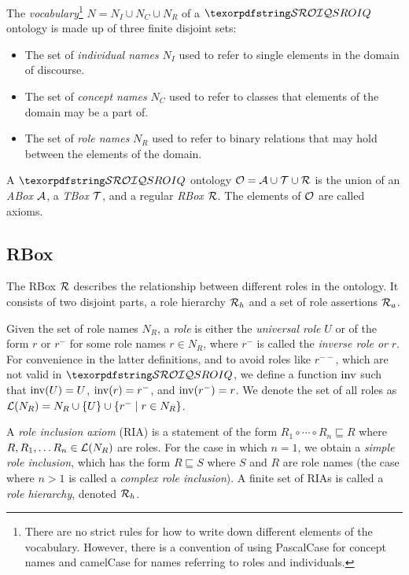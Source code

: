 
The \emph{vocabulary}\footnote{There are no strict rules for how to write down different elements of the vocabulary. However, there is a convention of using PascalCase for concept names and camelCase for names referring to roles and individuals.} $N = N_I \cup N_C \cup N_R$ of a $\SROIQ$ ontology is made up of three finite disjoint sets:
\begin{itemize}
  \item The set of \emph{individual names} $N_I$ used to refer to single elements in the domain of discourse.
  \item The set of \emph{concept names} $N_C$ used to refer to classes that elements of the domain may be a part of.
  \item The set of \emph{role names} $N_R$ used to refer to binary relations that may hold between the elements of the domain.
\end{itemize}
A $\SROIQ$ ontology $\mathcal{O} = \mathcal{A} \cup \mathcal{T} \cup \mathcal{R}$ is the union of an \emph{ABox} $\mathcal{A}$, a \emph{TBox} $\mathcal{T}$, and a regular \emph{RBox} $\mathcal{R}$. The elements of $\mathcal{O}$ are called axioms.

\subsection{RBox} \label{rbox}

The RBox $\mathcal{R}$ describes the relationship between different roles in the ontology. It consists of two disjoint parts, a role hierarchy $\mathcal{R}_h$ and a set of role assertions $\mathcal{R}_a$.

Given the set of role names $N_R$, a \emph{role} is either the \emph{universal role} $U$ or of the form $r$ or $r^-$ for some role names $r \in N_R$, where $r^-$ is called the \emph{inverse role or} $r$. For convenience in the latter definitions, and to avoid roles like $r^{--}$, which are not valid in $\SROIQ$, we define a function $\operatorname{inv}$ such that $\operatorname{inv}(U) = U$, $\operatorname{inv}(r) = r^-$, and $\operatorname{inv}(r^-) = r$. We denote the set of all roles as $\mathcal{L}(N_R) = N_R \cup \{ U \} \cup \{ r^- \mid r \in N_R \}$.

A \emph{role inclusion axiom} (RIA) is a statement of the form $R_1 \circ \cdots \circ R_n \sqsubseteq R$ where $R, R_1, \dots R_n \in \mathcal{L}(N_R)$ are roles. For the case in which $n = 1$, we obtain a \emph{simple role inclusion}, which has the form $R \sqsubseteq S$ where $S$ and $R$ are role names (the case where $n > 1$ is called a \emph{complex role inclusion}). A finite set of RIAs is called a \emph{role hierarchy}, denoted $\mathcal{R}_h$.


